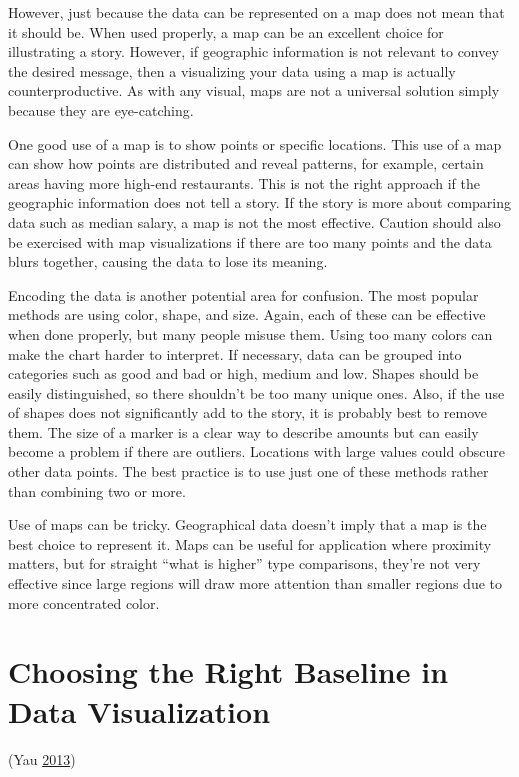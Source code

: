\documentclass[]{book}
\theoremstyle{definition}
\theoremstyle{definition}
\theoremstyle{definition}
\theoremstyle{remark}
\begin{document}
However, just because the data can be represented on a map does not mean
that it should be. When used properly, a map can be an excellent choice
for illustrating a story. However, if geographic information is not
relevant to convey the desired message, then a visualizing your data
using a map is actually counterproductive. As with any visual, maps are
not a universal solution simply because they are eye-catching.

One good use of a map is to show points or specific locations. This use
of a map can show how points are distributed and reveal patterns, for
example, certain areas having more high-end restaurants. This is not the
right approach if the geographic information does not tell a story. If
the story is more about comparing data such as median salary, a map is
not the most effective. Caution should also be exercised with map
visualizations if there are too many points and the data blurs together,
causing the data to lose its meaning.

Encoding the data is another potential area for confusion. The most
popular methods are using color, shape, and size. Again, each of these
can be effective when done properly, but many people misuse them. Using
too many colors can make the chart harder to interpret. If necessary,
data can be grouped into categories such as good and bad or high, medium
and low. Shapes should be easily distinguished, so there shouldn't be
too many unique ones. Also, if the use of shapes does not significantly
add to the story, it is probably best to remove them. The size of a
marker is a clear way to describe amounts but can easily become a
problem if there are outliers. Locations with large values could obscure
other data points. The best practice is to use just one of these methods
rather than combining two or more.

Use of maps can be tricky. Geographical data doesn't imply that a map is
the best choice to represent it. Maps can be useful for application
where proximity matters, but for straight ``what is higher'' type
comparisons, they're not very effective since large regions will draw
more attention than smaller regions due to more concentrated color.

\section{Choosing the Right Baseline in Data
Visualization}\label{choosing-the-right-baseline-in-data-visualization}

(Yau \protect\hyperlink{ref-baseline_2013}{2013})
\end{document}
